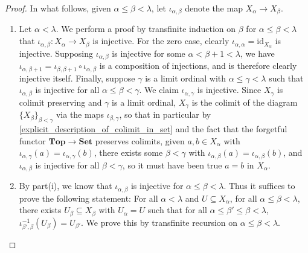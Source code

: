 \documentclass{amsart}
\theoremstyle{plain}
\theoremstyle{definition}
\newcommand{\Top}{\mbf{Top}}
\newcommand{\Set}{\mbf{Set}}
\newcommand{\sseq}{\subseteq}
\newcommand{\0}{\mathbf{0}}
\newcommand{\id}{\mathrm{id}}
\newcommand{\mbf}[1]{\mathbf{#1}}
\renewcommand{\(}{\left(}
\renewcommand{\)}{\right)}
\begin{document}
\begin{proof}
  In what follows, given $\alpha\leq\beta<\lambda$, let $\iota_{\alpha,\beta}$ denote the map $X_\alpha\to X_\beta$.
  \begin{enumerate}[label=(\roman*),listparindent=\parindent,parsep=0pt]
    \item Let $\alpha<\lambda$. We perform a proof by transfinite induction on $\beta$ for $\alpha\leq\beta<\lambda$ that $\iota_{\alpha,\beta}:X_\alpha\to X_\beta$ is injective. For the zero case, clearly $\iota_{\alpha,\alpha}=\id_{X_\alpha}$ is injective. Supposing $\iota_{\alpha,\beta}$ is injective for some $\alpha<\beta+1<\lambda$, we have $\iota_{\alpha,\beta+1}=\iota_{\beta,\beta+1}\circ\iota_{\alpha,\beta}$ is a composition of injections, and is therefore clearly injective itself. Finally, suppose $\gamma$ is a limit ordinal with $\alpha\leq\gamma<\lambda$ such that $\iota_{\alpha,\beta}$ is injective for all $\alpha\leq\beta<\gamma$. We claim $\iota_{\alpha,\gamma}$ is injective. Since $X_\gamma$ is colimit preserving and $\gamma$ is a limit ordinal, $X_\gamma$ is the colimit of the diagram $\{X_\beta\}_{\beta<\gamma}$ via the maps $\iota_{\beta,\gamma}$, so that in particular by \autoref{explicit_description_of_colimit_in_set} and the fact that the forgetful functor $\Top\to\Set$ preserves colimits, given $a,b\in X_\alpha$ with $\iota_{\alpha,\gamma}(a)=\iota_{\alpha,\gamma}(b)$, there exists some $\beta<\gamma$ with $\iota_{\alpha,\beta}(a)=\iota_{\alpha,\beta}(b)$, and $\iota_{\alpha,\beta}$ is injective for all $\beta<\gamma$, so it must have been true $a=b$ in $X_\alpha$. 
    \item By part(i), we know that $\iota_{\alpha,\beta}$ is injective for $\alpha\leq\beta<\lambda$. Thus it suffices to prove the following statement: For all $\alpha<\lambda$ and $U\sseq X_\alpha$, for all $\alpha\leq\beta<\lambda$, there exists $U_\beta\sseq X_\beta$ with $U_\alpha=U$ such that for all $\alpha\leq\beta'\leq\beta<\lambda$, $\iota_{\beta',\beta}^{-1}(U_\beta)=U_{\beta'}$. We prove this by transfinite recursion on $\alpha\leq\beta<\lambda$.
    

\end{enumerate}
\end{proof}
\end{document}
